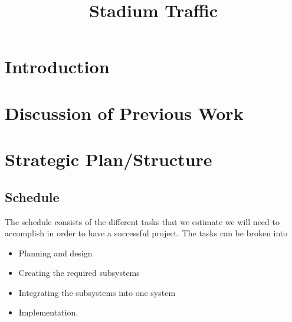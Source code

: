 \documentclass[12pt]{article}
\title{Stadium Traffic}
\begin{document}
\maketitle
\abstract



\newpage

\tableofcontents

\newpage

\mainmatter

\section{Introduction}



\section{Discussion of Previous Work}




\section{Strategic Plan/Structure}



\addtocounter{subsection}{1} %

\subsection{Schedule}
The schedule consists of the different tasks that we estimate we will
need to accomplish in order to have a successful project. The tasks
can be broken into

\begin{itemize}
  \item Planning and design
  \item Creating the required subsystems
  \item Integrating the subsystems into one system
  \item Implementation.
\end{itemize}
\end{document}
